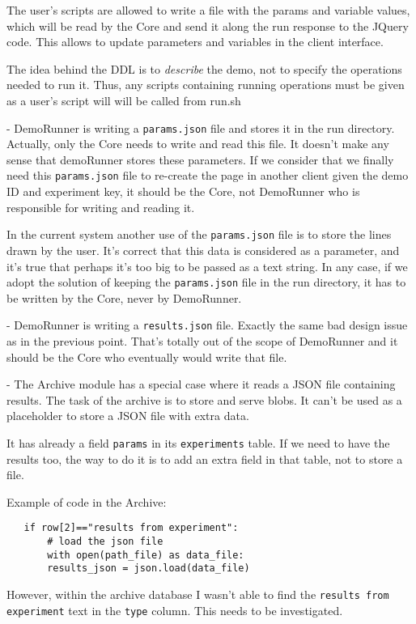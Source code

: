 \documentclass[a4paper,12pt]{article}
\begin{document}
The user's scripts are allowed to write a file with the params and variable values, which will be read by the Core and send it along the run response to the JQuery code. This allows to update parameters and variables in the client interface.

The idea behind the DDL is to \emph{describe} the demo, not to specify the operations needed to run it. Thus, any scripts containing running operations must be given as a user's script will will be called from run.sh

- DemoRunner is writing a {\tt params.json} file and stores it in the run directory. Actually, only the Core needs to write and read this file. It doesn't make any sense that demoRunner stores these parameters. If we consider that we finally need this {\tt params.json} file to re-create the page in another client given the demo ID and experiment key, it should be the Core, not DemoRunner who is responsible for writing and reading it.

In the current system another use of the {\tt params.json} file is to store the lines drawn by the user. It's correct that this data is considered as a parameter, and it's true that perhaps it's too big to be passed as a text string. In any case, if we adopt the solution of keeping the {\tt params.json} file in the run directory, it has to be written by the Core, never by DemoRunner.

- DemoRunner is writing a {\tt results.json} file. Exactly the same bad design issue as in the previous point. That's totally out of the scope of DemoRunner and it should be the Core who eventually would write that file.

- The Archive module has a special case where it reads a JSON file containing results. The task of the archive is to store and serve blobs. It can't be used as a placeholder to store a JSON file with extra data.

It has already a field {\tt params} in its {\tt experiments} table. If we need to have the results too, the way to do it is to add an extra field in that table, not to store a file.

Example of code in the Archive:
\begin{verbatim}
   if row[2]=="results from experiment":
       # load the json file
       with open(path_file) as data_file:
	   results_json = json.load(data_file)
\end{verbatim}

However, within the archive database I wasn't able to find the {\tt results from experiment} text in the {\tt type} column. This needs to be investigated.






\end{document}
